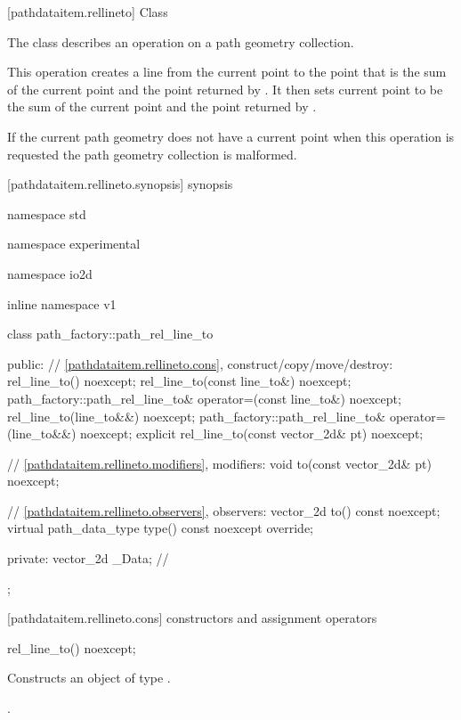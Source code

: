  [pathdataitem.rellineto] {Class }

\pnum
{}
The class  describes an operation on a path geometry collection.

\pnum
This operation creates a line from the current point to the point that is the sum of the current point and the point returned by . It then sets current point to be the sum of the current point and the point returned by .

\pnum
If the current path geometry does not have a current point when this operation is requested the path geometry collection is malformed.

 [pathdataitem.rellineto.synopsis] { synopsis}

\begin{codeblock}
namespace std { namespace experimental { namespace io2d { inline namespace v1 {
  class path_factory::path_rel_line_to {
  public:
    // \ref{pathdataitem.rellineto.cons}, construct/copy/move/destroy:
    rel_line_to() noexcept;
    rel_line_to(const line_to&) noexcept;
    path_factory::path_rel_line_to& operator=(const line_to&) noexcept;
    rel_line_to(line_to&&) noexcept;
    path_factory::path_rel_line_to& operator=(line_to&&) noexcept;
    explicit rel_line_to(const vector_2d& pt) noexcept;

    // \ref{pathdataitem.rellineto.modifiers}, modifiers:
    void to(const vector_2d& pt) noexcept;

    // \ref{pathdataitem.rellineto.observers}, observers:
    vector_2d to() const noexcept;
    virtual path_data_type type() const noexcept override;
    
  private:
    vector_2d _Data; // \expos
  };
} } } }
\end{codeblock}

 [pathdataitem.rellineto.cons] { constructors and assignment operators}

\begin{itemdecl}
    rel_line_to() noexcept;
\end{itemdecl}
\begin{itemdescr}
	\pnum
	\effects
	Constructs an object of type .
	
	\pnum
	\postconditions
	.
\end{itemdescr}

